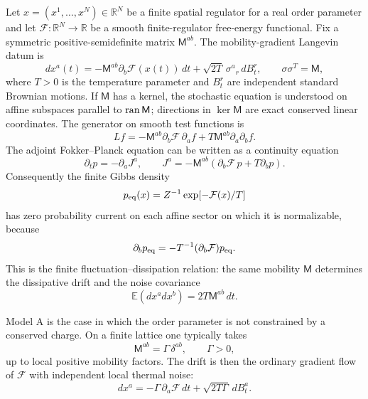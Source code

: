 Let \(x=(x^1,\ldots,x^N)\in\mathbb R^N\) be a finite spatial regulator for a
real order parameter and let \(\mathcal F:\mathbb R^N\to\mathbb R\) be a
smooth finite-regulator free-energy functional.  Fix a symmetric
positive-semidefinite matrix \(\mathsf M^{ab}\).  The mobility-gradient
Langevin datum is
\begin{equation}
  dx^a(t)
  =
  -\mathsf M^{ab}\partial_b\mathcal F(x(t))\,dt
  +\sqrt{2T}\,\sigma^a{}_r\,dB^r_t,
  \qquad
  \sigma\sigma^T=\mathsf M ,
  \label{eq:finite-mobility-gradient-langevin}
\end{equation}
where \(T>0\) is the temperature parameter and \(B^r_t\) are independent
standard Brownian motions.  If \(\mathsf M\) has a kernel, the stochastic
equation is understood on affine subspaces parallel to \({\rm ran}\,\mathsf
M\); directions in \(\ker\mathsf M\) are exact conserved linear coordinates.
The generator on smooth test functions is
\begin{equation}
  Lf
  =
  -\mathsf M^{ab}\partial_b\mathcal F\,\partial_a f
  +T\mathsf M^{ab}\partial_a\partial_b f .
  \label{eq:finite-mobility-gradient-generator}
\end{equation}
The adjoint Fokker--Planck equation can be written as a continuity equation
\begin{equation}
  \partial_t p=-\partial_a J^a,
  \qquad
  J^a
  =
  -\mathsf M^{ab}
  \left(
    \partial_b\mathcal F\,p+T\partial_b p
  \right).
  \label{eq:finite-mobility-gradient-fokker-planck-current}
\end{equation}
Consequently the finite Gibbs density
\begin{equation}
  p_{\rm eq}(x)=Z^{-1}\exp[-\mathcal F(x)/T]
  \label{eq:finite-model-ab-gibbs-density}
\end{equation}
has zero probability current on each affine sector on which it is
normalizable, because
\[
  \partial_b p_{\rm eq}= -T^{-1}(\partial_b\mathcal F)p_{\rm eq}.
\]
This is the finite fluctuation--dissipation relation: the same mobility
\(\mathsf M\) determines the dissipative drift and the noise covariance
\[
  \mathbb E(dx^a dx^b)=2T\mathsf M^{ab}\,dt .
\]

Model A is the case in which the order parameter is not constrained by a
conserved charge.  On a finite lattice one typically takes
\[
  \mathsf M^{ab}=\Gamma\,\delta^{ab},
  \qquad
  \Gamma>0,
\]
up to local positive mobility factors.  The drift is then the ordinary
gradient flow of \(\mathcal F\) with independent local thermal noise:
\begin{equation}
  dx^a=-\Gamma\,\partial_a\mathcal F\,dt
  +\sqrt{2T\Gamma}\,dB^a_t .
  \label{eq:finite-model-a-langevin}
\end{equation}

